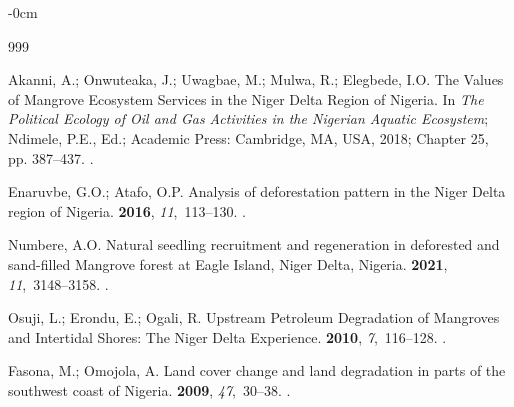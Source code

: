 \documentclass[jmse,article,accept,pdftex,moreauthors]{Definitions/mdpi}
\begin{document}
\begin{adjustwidth}{-\extralength}{0cm}
\begin{thebibliography}{999}


Akanni, A.; Onwuteaka, J.; Uwagbae, M.; Mulwa, R.; Elegbede, I.O.
\newblock The Values of Mangrove Ecosystem Services in the Niger
  Delta Region of Nigeria. In {\em The Political Ecology of Oil and Gas
  Activities in the Nigerian Aquatic Ecosystem}; Ndimele, P.E., Ed.; Academic
  Press: Cambridge, MA, USA, 2018; Chapter 25, pp. 387--437.
.

Enaruvbe, G.O.; Atafo, O.P.
\newblock Analysis of deforestation pattern in the Niger Delta region of
  Nigeria.
 {\bf 2016}, {\em 11},~113--130.
.

Numbere, A.O.
\newblock Natural seedling recruitment and regeneration in deforested and
  sand-filled Mangrove forest at Eagle Island, Niger Delta, Nigeria.
 {\bf 2021}, {\em 11},~3148--3158.
.

Osuji, L.; Erondu, E.; Ogali, R.
\newblock Upstream Petroleum Degradation of Mangroves and Intertidal Shores:
  The Niger Delta Experience.
 {\bf 2010}, {\em 7},~116--128.
.

Fasona, M.; Omojola, A.
\newblock Land cover change and land degradation in parts of the southwest
  coast of Nigeria.
 {\bf 2009}, {\em 47},~30--38.
.


\end{thebibliography}
\end{adjustwidth}
\end{document}
